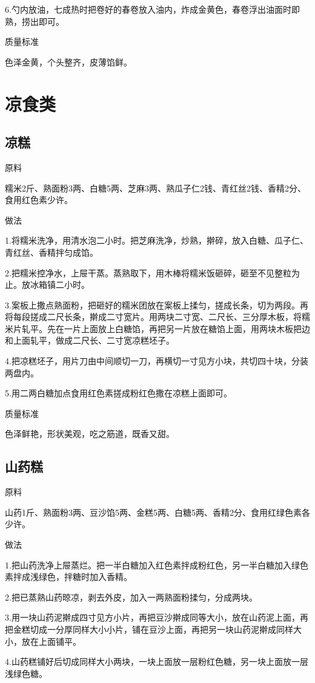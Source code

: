 \documentclass{ctexbook}
\begin{document}
6.勺内放油，七成热时把卷好的春卷放入油内，炸成金黄色，春卷浮出油面时即熟，捞出即可。

质量标准

色泽金黄，个头整齐，皮薄馅鲜。
\section{凉食类}
\subsection{凉糕}
原料

糯米2斤、熟面粉3两、白糖5两、芝麻3两、熟瓜子仁2钱、青红丝2钱、香精2分、食用红色素少许。

做法

1.将糯米洗净，用清水泡二小时。把芝麻洗净，炒熟，擀碎，放入白糖、瓜子仁、青红丝、香精拌匀成馅。

2.把糯米控净水，上屉干蒸。蒸熟取下，用木棒将糯米饭砸碎，砸至不见整粒为止。放冰箱镇二小时。

3.案板上撒点熟面粉，把砸好的糯米团放在案板上揉匀，搓成长条，切为两段。再将每段搓成二尺长条，擀成二寸宽片。用两块二寸宽、二尺长、三分厚木板，将糯米片轧平。先在一片上面放上白糖馅，再把另一片放在糖馅上面，用两块木板把边和上面轧平，做成二尺长、二寸宽凉糕坯子。

4.把凉糕坯子，用片刀由中间顺切一刀，再横切一寸见方小块，共切四十块，分装两盘内。

5.用二两白糖加点食用红色素搓成粉红色撒在凉糕上面即可。

质量标准

色泽鲜艳，形状美观，吃之筋道，既香又甜。
\subsection{山药糕}
原料

山药1斤、熟面粉3两、豆沙馅5两、金糕5两、白糖5两、香精2分、食用红绿色素各少许。

做法

1.把山药洗净上屉蒸烂。把一半白糖加入红色素拌成粉红色，另一半白糖加入绿色素拌成浅绿色，拌糖时加入香精。

2.把已蒸熟山药晾凉，剥去外皮，加入一两熟面粉揉匀，分成两块。

3.用一块山药泥擀成四寸见方小片，再把豆沙擀成同等大小，放在山药泥上面，再把金糕切成一分厚同样大小小片，铺在豆沙上面，再把另一块山药泥擀成同样大小，放在上面铺平。

4.山药糕铺好后切成同样大小两块，一块上面放一层粉红色糖，另一块上面放一层浅绿色糖。
\end{document}
